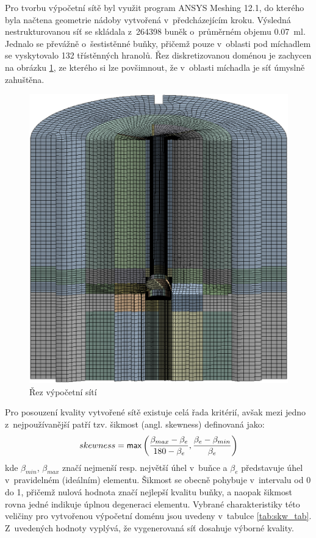 Pro tvorbu výpočetní sítě byl využit program ANSYS Meshing 12.1, do kterého byla načtena geometrie nádoby vytvořená v~předcházejícím kroku. Výsledná nestrukturovanou síť se skládala z~\num{264398} buněk o~průměrném objemu \SI{0.07}{\milli\litre}. Jednalo se převážně o~šestistěnné buňky, přičemž pouze v~oblasti pod míchadlem se vyskytovalo \num{132} třístěnných hranolů. Řez diskretizovanou doménou je zachycen na obrázku \ref{fig:mesh}, ze kterého si lze povšimnout, že v~oblasti míchadla je síť úmyslně zahuštěna. 
\begin{figure}[t]
\centering
\includegraphics[scale=0.28]{images/mesh.eps}
\caption{Řez výpočetní sítí}
\label{fig:mesh}
\end{figure} 
Pro posouzení kvality vytvořené sítě existuje celá řada kritérií, avšak mezi jedno z~nejpoužívanější patří tzv. šikmost (angl. skewness) definovaná jako:
\begin{equation}
      skewness = \mathsf{max}\left( \frac{\beta_{max} - \beta_{e}}{180 - \beta_{e}}, \frac{\beta_{e} - \beta_{min}}{\beta_{e}} \right)
  	\label{eq:skw}
\end{equation} 
kde $\beta_{min}$, $\beta_{max}$ značí nejmenší resp. největší úhel v~buňce a $\beta_{e}$ představuje úhel v~pravidelném (ideálním) elementu. Šikmost se obecně pohybuje v~intervalu od \num{0} do \num{1}, přičemž nulová hodnota značí nejlepší kvalitu buňky, a naopak šikmost rovna jedné indikuje úplnou degeneraci elementu. Vybrané charakteristiky této veličiny pro vytvořenou výpočetní doménu jsou uvedeny v~tabulce \ref{tab:skw_tab}. Z~uvedených hodnoty vyplývá, že vygenerovaná síť dosahuje výborné kvality.
